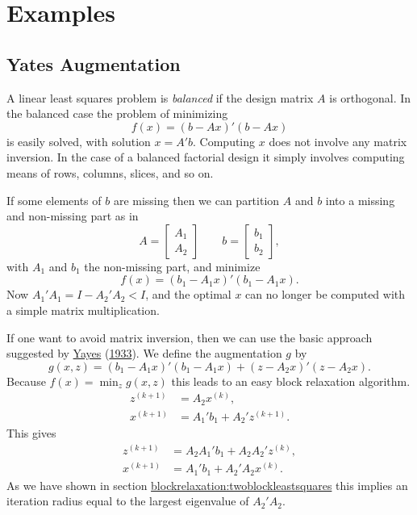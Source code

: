 \documentclass[
  12pt,
]{book}
\begin{document}
\hypertarget{examples}{%
\section{Examples}\label{examples}}

\hypertarget{yates-augmentation}{%
\subsection{Yates Augmentation}\label{yates-augmentation}}

A linear least squares problem is \emph{balanced} if the design matrix \(A\) is orthogonal.
In the balanced case the problem of minimizing
\[
f(x)=(b-Ax)'(b-Ax)\tag{1}
\]
is easily solved, with solution \(x=A'b\). Computing \(x\) does not involve any matrix inversion. In the case of a balanced factorial design it simply involves computing means of rows, columns, slices, and so on.

If some elements of \(b\) are missing then we can partition \(A\) and \(b\) into a missing and non-missing part as in
\[
A=\begin{bmatrix}A_1\\A_2\end{bmatrix}\qquad b=\begin{bmatrix}b_1\\b_2\end{bmatrix},
\]
with \(A_1\) and \(b_1\) the non-missing part, and minimize
\[
f(x)=(b_1-A_1x)'(b_1-A_1x).
\]
Now \(A_1'A_1=I-A_2'A_2<I\), and the optimal \(x\) can no longer be computed with a simple matrix multiplication.

If one want to avoid matrix inversion, then we can use the basic approach suggested by \protect\hyperlink{ref-yates_33}{Yayes} (\protect\hyperlink{ref-yates_33}{1933}). We define the augmentation \(g\) by
\[
g(x,z)=(b_1-A_1x)'(b_1-A_1x)+(z-A_2x)'(z-A_2x).
\]
Because \(f(x)=\min_z g(x,z)\) this leads to an easy block relaxation algorithm.
\begin{align*}
z^{(k+1)}&=A_2x^{(k)},\\
x^{(k+1)}&=A_1'b_1+A_2'z^{(k+1)}.
\end{align*}
This gives
\begin{align*}
z^{(k+1)}&=A_2A_1'b_1+A_2A_2'z^{(k)},\\
x^{(k+1)}&=A_1'b_1+A_2'A_2x^{(k)}.
\end{align*}
As we have shown in section \href{../blockrelaxation/bls.html}{blockrelaxation:twoblockleastsquares} this implies an iteration radius equal to the largest eigenvalue of \(A_2'A_2\).
\end{document}
